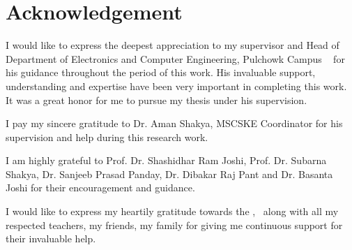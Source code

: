 
\chapter*{Acknowledgement}


I would like to express the deepest appreciation to my supervisor and Head of Department of Electronics and Computer Engineering, Pulchowk Campus \myadvisorA~ for his guidance throughout the period of this work. His invaluable support, understanding and expertise have been very important in completing this work. It was a great honor for me to pursue my thesis under his supervision.

I pay my sincere gratitude to Dr. Aman Shakya, MSCSKE Coordinator for his supervision and help during this research work.

I am highly grateful to Prof. Dr. Shashidhar Ram Joshi, Prof. Dr. Subarna Shakya, Dr. Sanjeeb Prasad Panday, Dr. Dibakar Raj Pant and Dr. Basanta Joshi for their encouragement and guidance.

I would like to express my heartily gratitude towards the \myinstitute, \mycampus ~along with all my respected teachers, my friends, my family for giving me continuous support for their invaluable help.


{\bf{\theauthor}}

{\bf{\roll}}


{\bf{\myinstitute}}



